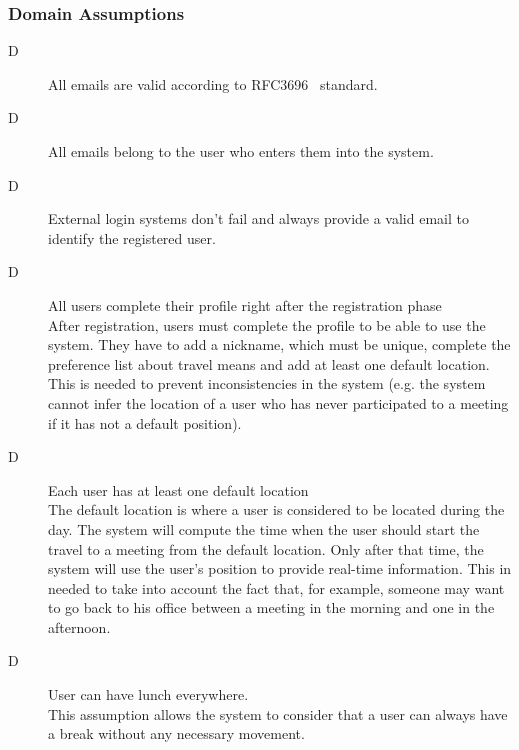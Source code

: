 \subsubsection{Domain Assumptions}

\begin{description}

\item[D\thecountDom] All emails are valid according to RFC3696~\cite{RFC3696} standard.

\item[D\thecountDom] All emails belong to the user who enters them into the system.

\item[D\thecountDom] External login systems don’t fail and always provide a valid email to identify the registered user.

\item[D\thecountDom] All users complete their profile right after the registration phase \\ [0.1cm]
After registration, users must complete the profile to be able to use the system. They have to add a nickname, which must be unique, complete the preference list about travel means and add at least one default location. This is needed to prevent inconsistencies in the system (e.g. the system cannot infer the location of a user who has never participated to a meeting if it has not a default position).

\item[D\thecountDom] Each user has at least one default location \\ [0.1cm]
The default location is where a user is considered to be located during the day. The system will compute the time when the user should start the travel to a meeting from the default location. Only after that time, the system will use the user's position to provide real-time information. This in needed to take into account the fact that, for example, someone may want to go back to his office between a meeting in the morning and one in the afternoon.

\item[D\thecountDom]  User can have lunch everywhere. \\ [0.1cm]
This assumption allows the system to consider that a user can always have a break without any necessary movement.


\end{description}

